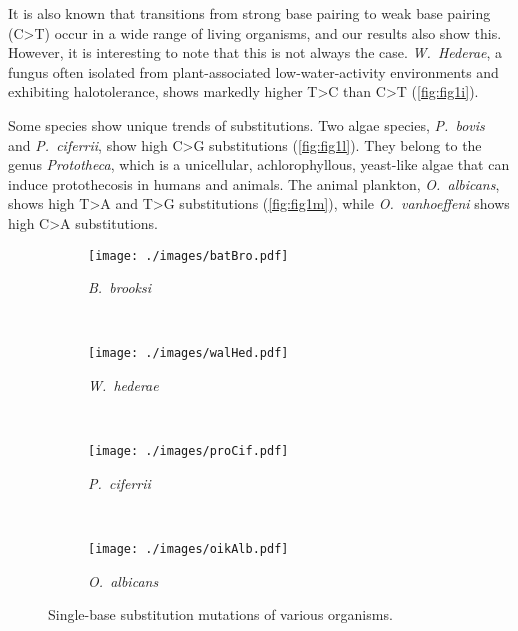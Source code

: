 \documentclass{article}
\begin{document}
  It is also known that transitions from strong base pairing to weak base pairing (C>T) occur in a wide range of living organisms, and our results also show this. However, it is interesting to note that this is not always the case. \textit{W.~Hederae}, a fungus often isolated from plant-associated low-water-activity environments and exhibiting halotolerance, shows markedly higher T>C than C>T (\autoref{fig:fig1i}).

  Some species show unique trends of substitutions.
  Two algae species, \textit{P.~bovis} and \textit{P.~ciferrii}, show high C>G substitutions (\autoref{fig:fig1l}). They belong to the genus \textit{Prototheca}, which is a unicellular, achlorophyllous, yeast-like algae that can induce protothecosis in humans and animals.
  The animal plankton, \textit{O.~albicans}, shows high T>A and T>G substitutions (\autoref{fig:fig1m}), while \textit{O.~vanhoeffeni} shows high C>A substitutions.

\begin{figure}[h!]
    \centering
    \begin{subfigure}{\textwidth}
      \centering
      \texttt{[image: ./images/batBro.pdf]}
      \caption{\textit{B.~brooksi}}
      \label{fig:fig1a}
    \end{subfigure}\\

    \begin{subfigure}{\textwidth}
      \centering
      \texttt{[image: ./images/walHed.pdf]}
      \caption{\textit{W.~hederae}}
      \label{fig:fig1i}
    \end{subfigure}\\

    \begin{subfigure}{\textwidth}
      \centering
      \texttt{[image: ./images/proCif.pdf]}
      \caption{\textit{P.~ciferrii}}
      \label{fig:fig1l}
    \end{subfigure}\\

    \begin{subfigure}{\textwidth}
      \centering
      \texttt{[image: ./images/oikAlb.pdf]}
      \caption{\textit{O.~albicans}}
      \label{fig:fig1m}
    \end{subfigure}

    \caption{Single-base substitution mutations of various organisms.}
    \label{fig:fig1}
\end{figure}


\end{document}
